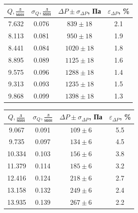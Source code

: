 \documentclass[a4paper]{article}
\begin{document}
\begin{enumerate}
\begin{multicols}{2}
\vspace{1em}
\begin{center}
    \begin{tabular}{|c|c|c|c|}
        \hline
        $Q, \frac{\text{л}}{\text{мин}}$ & $\sigma_Q, \frac{\text{л}}{\text{мин}}$ & $\Delta P \pm \sigma_{\Delta P}$, Па & $\varepsilon_{\Delta P}$, \% \\
        \hline
        7.632 & 0.076 & $839 \pm 18$ & 2.1 \\ \hline
        8.113 & 0.081 & $950 \pm 18$ & 1.9 \\ \hline
        8.441 & 0.084 & $1020 \pm 18$ & 1.8 \\ \hline
        8.895 & 0.089 & $1125 \pm 18$ & 1.6 \\ \hline
        9.575 & 0.096 & $1288 \pm 18$ & 1.4 \\ \hline
        9.313 & 0.093 & $1235 \pm 18$ & 1.5 \\ \hline
        9.868 & 0.099 & $1398 \pm 18$ & 1.3 \\ \hline
    \end{tabular}
\end{center}
\vspace{1em}
\begin{center}
    \begin{tabular}{|c|c|c|c|}
        \hline
        $Q, \frac{\text{л}}{\text{мин}}$ & $\sigma_Q, \frac{\text{л}}{\text{мин}}$ & $\Delta P \pm \sigma_{\Delta P}$, Па & $\varepsilon_{\Delta P}$, \% \\
        \hline
        9.067 & 0.091 & $109 \pm 6$ & 5.5 \\ \hline
        9.735 & 0.097 & $134 \pm 6$ & 4.5 \\ \hline
        10.334 & 0.103 & $156 \pm 6$ & 3.8 \\ \hline
        11.379 & 0.114 & $185 \pm 6$ & 3.2 \\ \hline
        12.416 & 0.124 & $218 \pm 6$ & 2.7 \\ \hline
        13.158 & 0.132 & $249 \pm 6$ & 2.4 \\ \hline
        13.935 & 0.139 & $267 \pm 6$ & 2.2 \\ \hline
    \end{tabular}
\end{center}
\vspace{1em}
\begin{center}

\end{center}
\end{multicols}
\end{enumerate}
\end{document}
